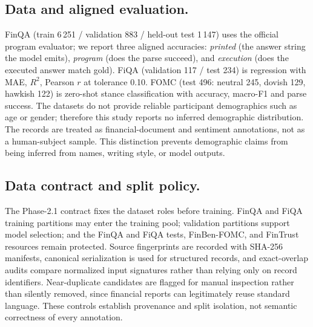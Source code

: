\documentclass[conference]{IEEEtran}
\begin{document}
\subsection{Data and aligned evaluation.}
FinQA (train 6\,251 / validation 883 / held-out test 1\,147) uses the official program
evaluator; we report three aligned accuracies: \emph{printed} (the answer string the model
emits), \emph{program} (does the parse succeed), and \emph{execution} (does the executed
answer match gold). FiQA (validation 117 / test 234) is regression with MAE, $R^2$,
Pearson $r$ at tolerance 0.10. FOMC (test 496: neutral 245, dovish 129, hawkish 122) is
zero-shot stance classification with accuracy, macro-F1 and parse success.
The datasets do not provide reliable participant demographics such as age or gender;
therefore this study reports no inferred demographic distribution. The records are treated
as financial-document and sentiment annotations, not as a human-subject sample. This
distinction prevents demographic claims from being inferred from names, writing style, or
model outputs.
\subsection{Data contract and split policy.}
The Phase-2.1 contract fixes the dataset roles before training. FinQA and FiQA training
partitions may enter the training pool; validation partitions support model selection; and
the FinQA and FiQA tests, FinBen-FOMC, and FinTrust resources remain protected. Source
fingerprints are recorded with SHA-256 manifests, canonical serialization is used for
structured records, and exact-overlap audits compare normalized input signatures rather
than relying only on record identifiers. Near-duplicate candidates are flagged for manual
inspection rather than silently removed, since financial reports can legitimately reuse
standard language. These controls establish provenance and split isolation, not semantic
correctness of every annotation.

\begin{table}[t]
\centering
\caption{Dataset roles and split sizes fixed by the Phase-2.1 contract.}
\label{tab:data-contract}
\small
{}
\end{table}
\end{document}
